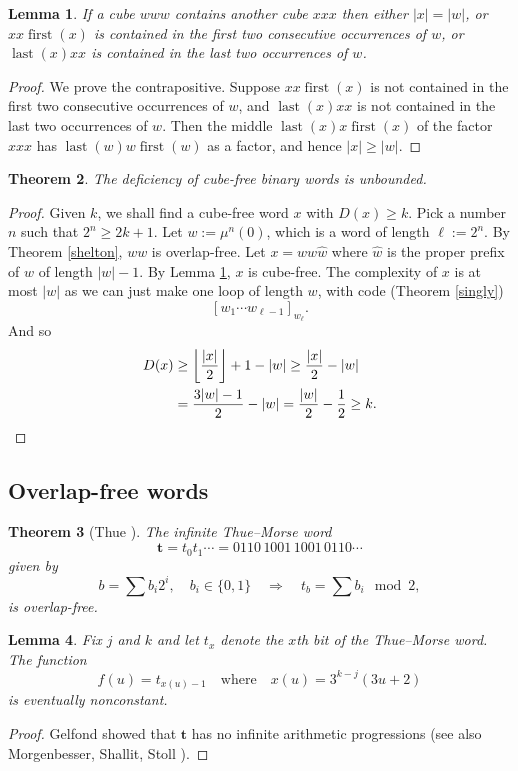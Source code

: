 \documentclass[12pt]{article}
\newcommand{\cubefree}{cube-free}
\newcommand{\abs}[1]{\lvert#1\rvert}
\theoremstyle{plain}
\newtheorem{thm}{Theorem}
\newtheorem{lem}[thm]{Lemma}
\theoremstyle{definition}
\theoremstyle{remark}
\DeclareMathOperator{\first}{first}
\DeclareMathOperator{\last}{last}
\begin{document}
			\begin{lem}\label{cubeContainsCube}
				If a cube $www$ contains another cube $xxx$ then either
				$\abs{x}=\abs{w}$, or
				$xx\first(x)$ is contained in the first two consecutive occurrences of $w$, or
				$\last(x)xx$ is contained in the last two occurrences of $w$.
			\end{lem}
			\begin{proof}
				We prove the contrapositive. Suppose $xx\first(x)$ is not contained in the first two consecutive occurrences of $w$, and
				$\last(x)xx$ is not contained in the last two occurrences of $w$.
				Then the middle $\last(x)x\first(x)$ of the factor $xxx$ has $\last(w)w\first(w)$ as a factor, and hence $\abs{x}\ge\abs{w}$.
			\end{proof}
			\begin{thm}
				The deficiency of {\cubefree} binary words is unbounded.
			\end{thm}
			\begin{proof}
				Given $k$, we shall find a {\cubefree} word $x$ with $D(x)\ge k$.
				Pick a number $n$ such that $2^n\ge 2k+1$.
				Let $w := \mu^n(0)$, which is a word of length $\ell := 2^n$.
				By Theorem \ref{shelton}, $ww$ is overlap-free.
				Let $x=ww\hat w$ where $\hat w$ is the proper prefix of $w$ of length $\abs{w}-1$.
				By Lemma \ref{cubeContainsCube}, $x$ is {\cubefree}.
				The complexity of $x$ is at most $\abs{w}$ as
				we can just make one loop of length $w$, with code (Theorem \ref{singly})
				\[
					{[w_1\cdots w_{\ell-1}]}_{w_{\ell}}.
				\]
				And so
				\begin{align*}
					D(x)&\ge \left\lfloor \frac{\abs{x}}2\right\rfloor + 1 - \abs{w} \ge \frac{\abs{x}}2 - \abs{w}
				\\
					&= \frac{3\abs{w}-1}{2} - \abs{w}
					= \frac{\abs{w}}2 - \frac12 \ge k.\qedhere\\
				\end{align*}
			\end{proof}
		\subsection{Overlap-free words}
			\begin{thm}[Thue \cite{ThueTwo}]\label{thueStrong}
				The infinite Thue--Morse word
				\[
					\mathbf t = t_0t_1\cdots = 0110\, 1001\, 1001\, 0110\cdots
				\]
				given by
				\[
				 	b=\sum b_i2^i,\quad b_i\in\{0,1\}
					\quad\Longrightarrow\quad
					t_b=\sum b_i\mod 2,
				\]
				is overlap-free.
			\end{thm}
			\begin{lem}\label{gelfond}
				Fix $j$ and $k$ and let $t_x$ denote the $x$th bit of the Thue--Morse word. The function
				\[
					f(u)=t_{x(u)-1}\quad\mathrm{where}\quad x(u) = 3^{k - j}(3u + 2)
				\]
				is eventually nonconstant.
			\end{lem}
			\begin{proof}
				Gelfond \cite{MR0220693} showed that $\mathbf t$ has no infinite arithmetic progressions
				(see also Morgenbesser, Shallit, Stoll \cite{MR2793891}).
			\end{proof}
\end{document}

